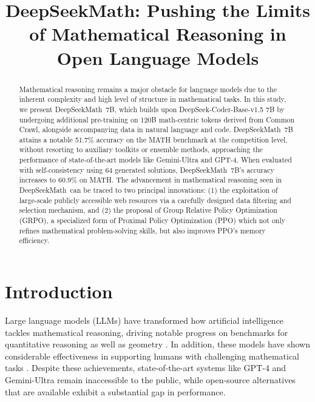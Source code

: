 \title{DeepSeekMath: Pushing the Limits of Mathematical Reasoning in Open Language Models}

\begin{abstract}
Mathematical reasoning remains a major obstacle for language models due to the inherent complexity and high level of structure in mathematical tasks. In this study, we present DeepSeekMath~7B, which builds upon DeepSeek-Coder-Base-v1.5 7B by undergoing additional pre-training on 120B math-centric tokens derived from Common Crawl, alongside accompanying data in natural language and code. DeepSeekMath~7B attains a notable 51.7\% accuracy on the MATH benchmark at the competition level, without resorting to auxiliary toolkits or ensemble methods, approaching the performance of state-of-the-art models like Gemini-Ultra and GPT-4. When evaluated with self-consistency using 64 generated solutions, DeepSeekMath~7B’s accuracy increases to 60.9\% on MATH. The advancement in mathematical reasoning seen in DeepSeekMath~can be traced to two principal innovations: (1) the exploitation of large-scale publicly accessible web resources via a carefully designed data filtering and selection mechanism, and (2) the proposal of Group Relative Policy Optimization (GRPO), a specialized form of Proximal Policy Optimization (PPO) which not only refines mathematical problem-solving skills, but also improves PPO’s memory efficiency.
\end{abstract}

\section{Introduction}

Large language models (LLMs) have transformed how artificial intelligence tackles mathematical reasoning, driving notable progress on benchmarks for quantitative reasoning \citep{MATH} as well as geometry \citep{trinh2024solving}. In addition, these models have shown considerable effectiveness in supporting humans with challenging mathematical tasks \citep{tao}. Despite these achievements, state-of-the-art systems like GPT-4 \citep{gpt4} and Gemini-Ultra \citep{gemini} remain inaccessible to the public, while open-source alternatives that are available exhibit a substantial gap in performance.

